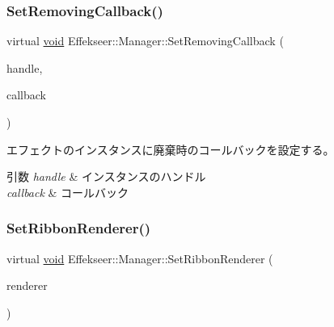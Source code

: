 \mbox{\label{class_effekseer_1_1_manager_a62c24747994008dfcb84a0adcd53b3ad}} 
\subsubsection{\texorpdfstring{Set\+Removing\+Callback()}{SetRemovingCallback()}}
{\footnotesize\ttfamily virtual \mbox{\hyperlink{namespace_effekseer_ab34c4088e512200cf4c2716f168deb56}{void}} Effekseer\+::\+Manager\+::\+Set\+Removing\+Callback (\begin{DoxyParamCaption}\item[{\mbox{\hyperlink{namespace_effekseer_afba58b8d812da862190e9bbfc040824a}{Handle}}}]{handle,  }\item[{Effect\+Instance\+Removing\+Callback}]{callback }\end{DoxyParamCaption})\hspace{0.3cm}{\ttfamily [pure virtual]}}



エフェクトのインスタンスに廃棄時のコールバックを設定する。 


\begin{DoxyParams}{引数}
{\em handle} & インスタンスのハンドル \\
\hline
{\em callback} & コールバック \\
\hline
\end{DoxyParams}
\mbox{\label{class_effekseer_1_1_manager_afe6fa26d93c9c80a0afb8f4fbe0afe20}} 
\subsubsection{\texorpdfstring{Set\+Ribbon\+Renderer()}{SetRibbonRenderer()}}
{\footnotesize\ttfamily virtual \mbox{\hyperlink{namespace_effekseer_ab34c4088e512200cf4c2716f168deb56}{void}} Effekseer\+::\+Manager\+::\+Set\+Ribbon\+Renderer (\begin{DoxyParamCaption}\item[{\mbox{\hyperlink{class_effekseer_1_1_ribbon_renderer}{Ribbon\+Renderer}} $\ast$}]{renderer }\end{DoxyParamCaption})\hspace{0.3cm}{\ttfamily [pure virtual]}}



